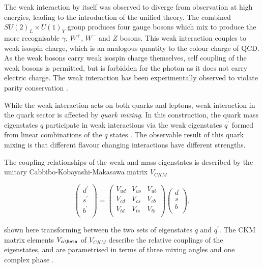 		The weak interaction by itself was observed to diverge from observation at high energies, leading to the introduction of the unified theory. The combined $SU(2)_L\times U(1)_Y$ group produces four gauge bosons which mix to produce the more recognisable $\gamma$, $W^+$, $W^-$ and $Z$ bosons. This weak interaction couples to weak isospin charge, which is an analogous quantity to the colour charge of QCD. As the weak bosons carry weak isospin charge themselves, self coupling of the weak bosons is permitted, but is forbidden for the photon as it does not carry electric charge. The weak interaction has been experimentally observed to violate parity conservation \cite{parityviolation, martinshaw}.

		While the weak interaction acts on both quarks and leptons, weak interaction in the quark sector is affected by \textit{quark mixing}. In this construction, the quark mass eigenstates $q$ participate in weak interactions via the weak eigenstates $q^\prime$ formed from linear combinations of the $q$ states \cite{martinshaw}. The observable result of this quark mixing is that different flavour changing interactions have different strengths.

		\newpage
		The coupling relationships of the weak and mass eigenstates is described by the unitary Cabbibo-Kobayashi-Makasawa  matrix $V_{CKM}$ \cite{ckm-c, ckm-km}

		\begin{equation}
		\begin{pmatrix}
		d^\prime \\
		s^\prime\\
		b^\prime \\
		\end{pmatrix}
		 = \begin{pmatrix}
		V_{ud} & V_{us} & V_{ub} \\
		V_{cd} & V_{cs} & V_{cb} \\
		V_{td} & V_{ts} & V_{tb} \\
		\end{pmatrix}
	    \begin{pmatrix}
	    d \\
	    s\\
	    b \\
	    \end{pmatrix},
		\end{equation}

		shown here transforming between the two sets of eigenstates $q$ and $q^\prime$. The CKM matrix elements $V_{\alpha\Beta}$ of $V_{CKM}$ describe the relative couplings of the eigenstates, and are parametrised in terms of three mixing angles and one complex phase \cite{ckm-km, ckmparam}.

